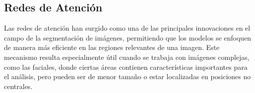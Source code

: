

\subsection{Redes de Atención}  
Las redes de atención han surgido como una de las principales innovaciones en el campo de la segmentación de imágenes, permitiendo que los modelos se enfoquen de manera más eficiente en las regiones relevantes de una imagen. Este mecanismo resulta especialmente útil cuando se trabaja con imágenes complejas, como las faciales, donde ciertas áreas contienen características importantes para el análisis, pero pueden ser de menor tamaño o estar localizadas en posiciones no centrales.

